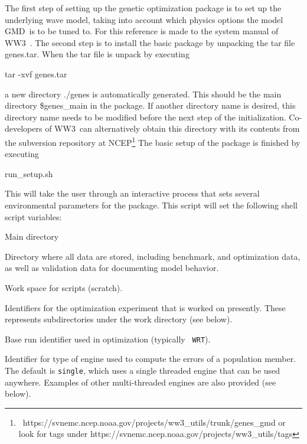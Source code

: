 \documentclass[12pt]{article}
\newcommand{\ws}{WW3}
\newcommand{\gmd}{GMD}
\newcommand{\file}{\sf}
\newcommand{\code}{\tt}
\newenvironment{plist}{\begin{list}{nofile ?}{\parsep 0mm
            \itemsep 0mm \leftmargin 35mm \labelwidth 25mm
            \rightmargin 10mm}}{\end{list}}
\newcommand{\pit}[2]{\item[{\code{#1}}\hfill]{#2}}
\begin{document}
The first step of setting up the genetic optimization package is to set up the
underlying wave model, taking into account which physics options the model
\gmd\ is to be tuned to. For this reference is made to the system manual of
\ws\ \citep{tol:MMABmanual}. The second step is to install the basic package
by unpacking the tar file {\file genes.tar}. When the tar file is unpack by
executing
\begin{center}
{\file tar -xvf genes.tar}
\end{center}
\noindent
a new directory {\file ./genes} is automatically generated. This should be the
main directory {\file \$genes\_main} in the package. If another directory name
is desired, this directory name needs to be modified before the next step of
the initialization. Co-developers of \ws\ can alternatively obtain this
directory with its contents from the subversion repository at
NCEP\footnote{~https://svnemc.ncep.noaa.gov/projects/ww3\_utils/trunk/genes\_gmd
or look for tags under https://svnemc.ncep.noaa.gov/projects/ww3\_utils/tags}
The basic setup of the package is finished by executing
\begin{center}
{\file run\_setup.sh}
\end{center}
\noindent
This will take the user through an interactive process that sets several
environmental parameters for the package. This script will set the following
shell script variables:

\begin{plist}
\pit{\$genes\_main}{Main directory}
\pit{\$genes\_data}{Directory where all data are stored, including benchmark,
                    and optimization data, as well as validation data for
		    documenting model behavior.}
\pit{\$genes\_work}{Work space for scripts (scratch).}
\pit{\$genes\_expN}{Identifiers for the optimization experiment that is worked
                    on presently. These represents subdirectories under the
                    work directory (see below).}
\pit{\$genes\_base}{Base run identifier used in optimization (typically {\code
                    WRT}).}
\pit{\$genes\_engn}{Identifier for type of engine used to compute the errors
                    of a population member. The default is {\code single},
                    which uses a single threaded engine that can be used
                    anywhere. Examples of other multi-threaded engines are
                    also provided (see below).}
\end{plist}
\end{document}
